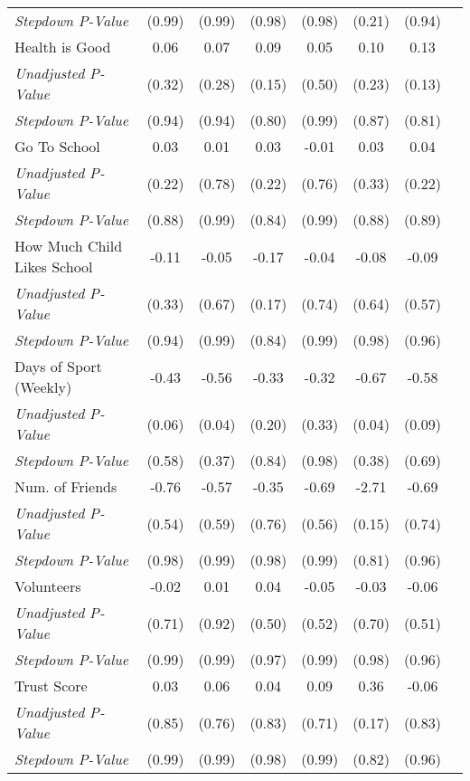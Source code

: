 \begin{tabular}{l c c c c c c c}
\quad \textit{Stepdown P-Value} & (0.99) & (0.99) & (0.98) & (0.98) & (0.21) & (0.94) \\
Health is Good & 0.06 & 0.07 & 0.09 & 0.05 & 0.10 & 0.13 \\
\quad \textit{Unadjusted P-Value} & (0.32) & (0.28) & (0.15) & (0.50) & (0.23) & (0.13) \\
\quad \textit{Stepdown P-Value} & (0.94) & (0.94) & (0.80) & (0.99) & (0.87) & (0.81) \\
Go To School & 0.03 & 0.01 & 0.03 & -0.01 & 0.03 & 0.04 \\
\quad \textit{Unadjusted P-Value} & (0.22) & (0.78) & (0.22) & (0.76) & (0.33) & (0.22) \\
\quad \textit{Stepdown P-Value} & (0.88) & (0.99) & (0.84) & (0.99) & (0.88) & (0.89) \\
How Much Child Likes School & -0.11 & -0.05 & -0.17 & -0.04 & -0.08 & -0.09 \\
\quad \textit{Unadjusted P-Value} & (0.33) & (0.67) & (0.17) & (0.74) & (0.64) & (0.57) \\
\quad \textit{Stepdown P-Value} & (0.94) & (0.99) & (0.84) & (0.99) & (0.98) & (0.96) \\
Days of Sport (Weekly) & -0.43 & -0.56 & -0.33 & -0.32 & -0.67 & -0.58 \\
\quad \textit{Unadjusted P-Value} & (0.06) & (0.04) & (0.20) & (0.33) & (0.04) & (0.09) \\
\quad \textit{Stepdown P-Value} & (0.58) & (0.37) & (0.84) & (0.98) & (0.38) & (0.69) \\
Num. of Friends & -0.76 & -0.57 & -0.35 & -0.69 & -2.71 & -0.69 \\
\quad \textit{Unadjusted P-Value} & (0.54) & (0.59) & (0.76) & (0.56) & (0.15) & (0.74) \\
\quad \textit{Stepdown P-Value} & (0.98) & (0.99) & (0.98) & (0.99) & (0.81) & (0.96) \\
Volunteers & -0.02 & 0.01 & 0.04 & -0.05 & -0.03 & -0.06 \\
\quad \textit{Unadjusted P-Value} & (0.71) & (0.92) & (0.50) & (0.52) & (0.70) & (0.51) \\
\quad \textit{Stepdown P-Value} & (0.99) & (0.99) & (0.97) & (0.99) & (0.98) & (0.96) \\
Trust Score & 0.03 & 0.06 & 0.04 & 0.09 & 0.36 & -0.06 \\
\quad \textit{Unadjusted P-Value} & (0.85) & (0.76) & (0.83) & (0.71) & (0.17) & (0.83) \\
\quad \textit{Stepdown P-Value} & (0.99) & (0.99) & (0.98) & (0.99) & (0.82) & (0.96) \\
\bottomrule
\end{tabular}
